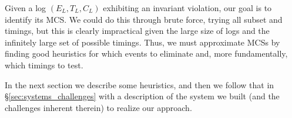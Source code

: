 Given a log $(E_L, T_L, C_L)$ exhibiting an invariant violation,
our goal is to identify its MCS. We could do this through brute force, trying all subset and timings, but this is clearly impractical given the large size of logs and the infinitely large set of possible timings. Thus, we must approximate MCSs by finding good heuristics for which events to eliminate and, more fundamentally, which timings to test.

In the next section we describe some heuristics, and then we follow that in \S\ref{sec:systems_challenges} with a description of the system we built (and the challenges inherent therein) to realize our approach.

